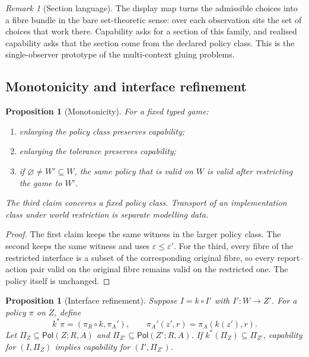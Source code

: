 \documentclass[11pt]{article}
\theoremstyle{plain}
\newtheorem{proposition}[theorem]{Proposition}
\theoremstyle{definition}
\theoremstyle{remark}
\newtheorem{remark}[theorem]{Remark}
\newcommand{\Pol}{\mathsf{Pol}}
\newcommand{\eps}{\varepsilon}
\begin{document}
\begin{remark}[Section language]
The display map turns the admissible choices into a fibre bundle in the bare
set-theoretic sense: over each observation sits the set of choices that work
there. Capability asks for a section of this family, and realised capability asks
that the section come from the declared policy class. This is the
single-observer prototype of the multi-context gluing problems.
\end{remark}

\subsection{Monotonicity and interface refinement}

\begin{proposition}[Monotonicity]\label{prop:monotone}
For a fixed typed game:
\begin{enumerate}[label=(\roman*)]
\item enlarging the policy class preserves capability;
\item enlarging the tolerance preserves capability;
\item if $\varnothing\ne W'\subseteq W$, the same policy that is valid on $W$
is valid after restricting the game to $W'$.
\end{enumerate}
The third claim concerns a fixed policy class. Transport of an implementation
class under world restriction is separate modelling data.
\end{proposition}

\begin{proof}
The first claim keeps the same witness in the larger policy class. The second
keeps the same witness and uses $\eps\le\eps'$. For the third, every fibre of the
restricted interface is a subset of the corresponding original fibre, so every
report--action pair valid on the original fibre remains valid on the restricted
one. The policy itself is unchanged.
\end{proof}

\begin{proposition}[Interface refinement]\label{prop:refine}
Suppose $I=k\circ I'$ with $I':W\to Z'$. For a policy $\pi$ on $Z$, define
\[
k^*\pi=(\pi_R\circ k,\pi_A'),\qquad
\pi_A'(z',r)=\pi_A(k(z'),r).
\]
Let $\Pi_Z\subseteq\Pol(Z;R,A)$ and
$\Pi_{Z'}\subseteq\Pol(Z';R,A)$. If
$k^*(\Pi_Z)\subseteq\Pi_{Z'}$, capability for $(I,\Pi_Z)$ implies capability
for $(I',\Pi_{Z'})$.
\end{proposition}
\end{document}
